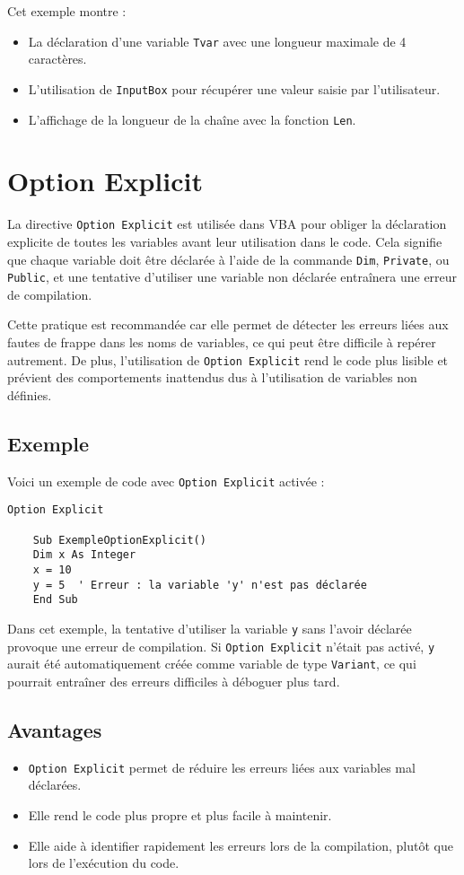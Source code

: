 \documentclass[a4paper,12pt]{report}
\begin{document}
Cet exemple montre :
\begin{itemize}
	\item La déclaration d'une variable \texttt{Tvar} avec une longueur maximale de 4 caractères.
	\item L'utilisation de \texttt{InputBox} pour récupérer une valeur saisie par l'utilisateur.
	\item L'affichage de la longueur de la chaîne avec la fonction \texttt{Len}.
\end{itemize}

\section{Option Explicit}
La directive \texttt{Option Explicit} est utilisée dans VBA pour obliger la déclaration explicite de toutes les variables avant leur utilisation dans le code. Cela signifie que chaque variable doit être déclarée à l'aide de la commande \texttt{Dim}, \texttt{Private}, ou \texttt{Public}, et une tentative d'utiliser une variable non déclarée entraînera une erreur de compilation.

Cette pratique est recommandée car elle permet de détecter les erreurs liées aux fautes de frappe dans les noms de variables, ce qui peut être difficile à repérer autrement. De plus, l'utilisation de \texttt{Option Explicit} rend le code plus lisible et prévient des comportements inattendus dus à l'utilisation de variables non définies.

\subsection{Exemple}

Voici un exemple de code avec \texttt{Option Explicit} activée :

\begin{lstlisting}[language=VBScript]
	Option Explicit
	
	Sub ExempleOptionExplicit()
	Dim x As Integer
	x = 10
	y = 5  ' Erreur : la variable 'y' n'est pas déclarée
	End Sub
\end{lstlisting}

Dans cet exemple, la tentative d'utiliser la variable \texttt{y} sans l'avoir déclarée provoque une erreur de compilation. Si \texttt{Option Explicit} n'était pas activé, \texttt{y} aurait été automatiquement créée comme variable de type \texttt{Variant}, ce qui pourrait entraîner des erreurs difficiles à déboguer plus tard.

\subsection{Avantages}
\begin{itemize}
	\item \texttt{Option Explicit} permet de réduire les erreurs liées aux variables mal déclarées.
	\item Elle rend le code plus propre et plus facile à maintenir.
	\item Elle aide à identifier rapidement les erreurs lors de la compilation, plutôt que lors de l'exécution du code.
\end{itemize}
\end{document}
